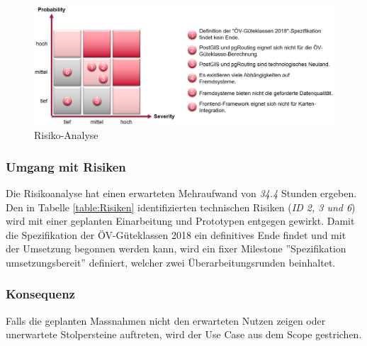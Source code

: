 \begin{figure}[ht]
    \centering
    \includegraphics[width=1.0\linewidth]{projectdoc/img/risk_analysis}
    \caption[Risiko-Analyse]{Risiko-Analyse}
    \label{fig:risk_analysis}
\end{figure}

\subsubsection{Umgang mit Risiken}
\label{Risiken:Umang mit Risiken}

Die Risikoanalyse hat einen erwarteten Mehraufwand von \emph{34.4} Stunden ergeben.
Den in Tabelle \ref{table:Risiken} identifizierten technischen Risiken (\emph{ID 2, 3 und 6}) wird mit einer geplanten Einarbeitung und Prototypen entgegen gewirkt.
Damit die Spezifikation der \acs{ÖV}-Güteklassen 2018 ein definitives Ende findet und mit der Umsetzung begonnen werden kann, wird ein fixer Milestone ''Spezifikation umsetzungsbereit'' definiert, welcher zwei Überarbeitungsrunden beinhaltet.

\subsubsection{Konsequenz}
\label{Risiken:Konsequenz}

Falls die geplanten Massnahmen nicht den erwarteten Nutzen zeigen oder unerwartete Stolpersteine auftreten, wird der Use Case  aus dem Scope gestrichen.
